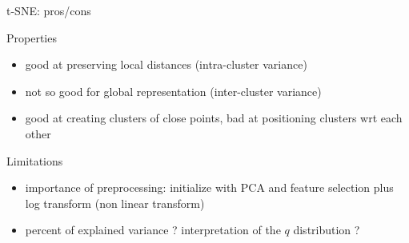 \documentclass{beamer}\usepackage[]{graphicx}\usepackage[]{color}
\begin{document}


\begin{frame}{t-SNE: pros/cons}

\begin{block}{Properties}
\begin{itemize}
\item good at preserving local distances (intra-cluster variance)
\item not so good for global representation (inter-cluster variance)
\item good at creating clusters of close points, bad at positioning clusters wrt each other
\end{itemize}
\end{block}

\begin{block}{Limitations}
\begin{itemize}
  \item importance of preprocessing: initialize with PCA and feature selection plus log transform (non linear transform)
\item percent of explained variance ? interpretation of the $q$ distribution ?
\end{itemize}
\end{block}

\end{frame}
\end{document}
